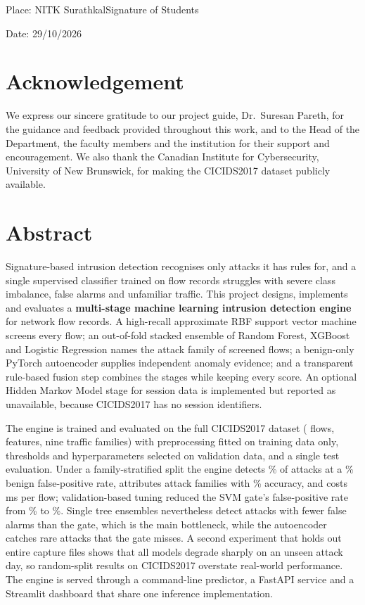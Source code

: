 \documentclass[12pt,a4paper,oneside]{report}
\newcommand{\GuideName}{Dr.\ Suresan Pareth}
\newcommand{\SubmissionDate}{29/10/2026}
\newcommand{\SubmissionPlace}{NITK Surathkal}
\begin{document}
\vspace{2cm}
\noindent Place: \SubmissionPlace \hfill Signature of Students

\noindent Date: \SubmissionDate
\clearpage

\chapter*{Acknowledgement}
We express our sincere gratitude to our project guide, \GuideName, for the guidance and feedback provided throughout this work, and to the Head of the Department, the faculty members and the institution for their support and encouragement. We also thank the Canadian Institute for Cybersecurity, University of New Brunswick, for making the CICIDS2017 dataset publicly available.
\clearpage

\chapter*{Abstract}
Signature-based intrusion detection recognises only attacks it has rules for, and a single supervised classifier trained on flow records struggles with severe class imbalance, false alarms and unfamiliar traffic. This project designs, implements and evaluates a \textbf{multi-stage machine learning intrusion detection engine} for network flow records. A high-recall approximate RBF support vector machine screens every flow; an out-of-fold stacked ensemble of Random Forest, XGBoost and Logistic Regression names the attack family of screened flows; a benign-only PyTorch autoencoder supplies independent anomaly evidence; and a transparent rule-based fusion step combines the stages while keeping every score. An optional Hidden Markov Model stage for session data is implemented but reported as unavailable, because CICIDS2017 has no session identifiers.

The engine is trained and evaluated on the full CICIDS2017 dataset (\TotalRows{} flows, \NumFeatures{} features, nine traffic families) with preprocessing fitted on training data only, thresholds and hyperparameters selected on validation data, and a single test evaluation. Under a family-stratified split the engine detects \EoneFusionRecall\% of attacks at a \EoneFusionFpr\% benign false-positive rate, attributes attack families with \EoneStackAccuracy\% accuracy, and costs \EoneMsPerFlow{} ms per flow; validation-based tuning reduced the SVM gate's false-positive rate from \SvmValFprBefore\% to \SvmValFprAfter\%. Single tree ensembles nevertheless detect attacks with fewer false alarms than the gate, which is the main bottleneck, while the autoencoder catches rare attacks that the gate misses. A second experiment that holds out entire capture files shows that all models degrade sharply on an unseen attack day, so random-split results on CICIDS2017 overstate real-world performance. The engine is served through a command-line predictor, a FastAPI service and a Streamlit dashboard that share one inference implementation.
\end{document}

